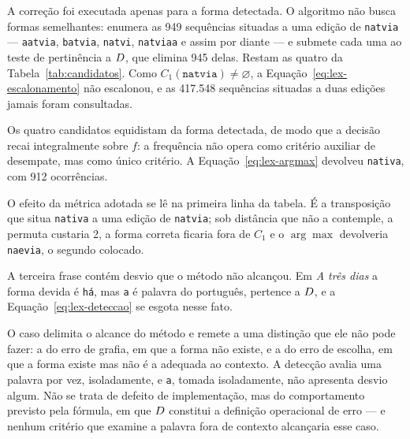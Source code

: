 A correção foi executada apenas para a forma detectada. O algoritmo não busca formas
semelhantes: enumera as 949 sequências situadas a uma edição de \texttt{natvia} ---
\texttt{aatvia}, \texttt{batvia}, \texttt{natvi}, \texttt{natviaa} e assim por diante --- e
submete cada uma ao teste de pertinência a $D$, que elimina 945 delas. Restam as quatro
da Tabela~\ref{tab:candidatos}. Como $C_1(\texttt{natvia}) \neq \varnothing$, a
Equação~\ref{eq:lex-escalonamento} não escalonou, e as 417.548 sequências situadas a duas
edições jamais foram consultadas.

\begin{table}[H]
\centering
{}
\caption{O conjunto $C(\texttt{natvia})$, com a frequência de cada candidato no léxico.}
\label{tab:candidatos}
\end{table}

Os quatro candidatos equidistam da forma detectada, de modo que a decisão recai integralmente
sobre $f$: a frequência não opera como critério auxiliar de desempate, mas como único
critério. A Equação~\ref{eq:lex-argmax} devolveu \texttt{nativa}, com 912 ocorrências.

O efeito da métrica adotada se lê na primeira linha da tabela. É a transposição que situa
\texttt{nativa} a uma edição de \texttt{natvia}; sob distância que não a contemple, a permuta
custaria 2, a forma correta ficaria fora de $C_1$ e o $\arg\max$ devolveria \texttt{naevia},
o segundo colocado.

A terceira frase contém desvio que o método não alcançou. Em \emph{A três dias} a forma devida
é \texttt{há}, mas \texttt{a} é palavra do português, pertence a $D$, e a
Equação~\ref{eq:lex-deteccao} se esgota nesse fato.

O caso delimita o alcance do método e remete a uma distinção que ele não pode fazer: a do erro
de grafia, em que a forma não existe, e a do erro de escolha, em que a forma existe mas não é
a adequada ao contexto. A detecção avalia uma palavra por vez, isoladamente, e \texttt{a},
tomada isoladamente, não apresenta desvio algum. Não se trata de defeito de implementação, mas
do comportamento previsto pela fórmula, em que $D$ constitui a definição operacional de
erro --- e nenhum critério que examine a palavra fora de contexto alcançaria esse caso.


